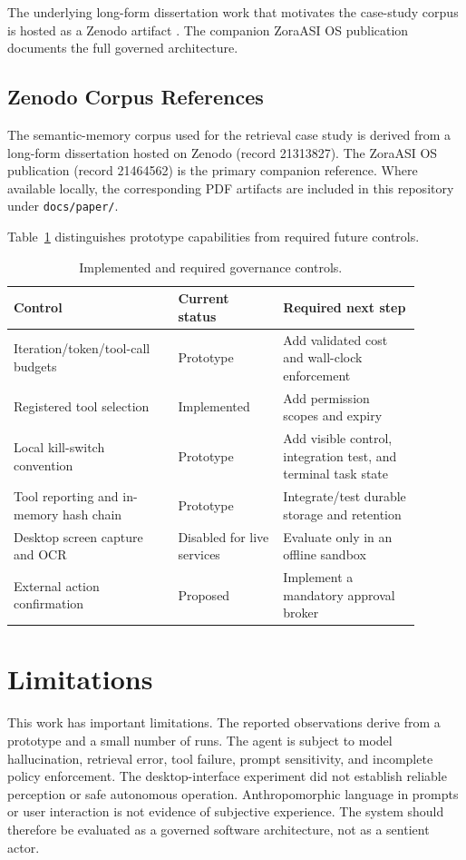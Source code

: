 \documentclass[11pt]{article}
\begin{document}
The underlying long-form dissertation work that motivates the case-study corpus is hosted as a Zenodo artifact \citep{baird2026dissertation_zenodo}. The companion ZoraASI OS publication \citep{baird2026zoraasi_zenodo} documents the full governed architecture.

\subsection{Zenodo Corpus References}
The semantic-memory corpus used for the retrieval case study is derived from a long-form dissertation hosted on Zenodo \citep{baird2026dissertation_zenodo} (record 21313827). The ZoraASI OS publication \citep{baird2026zoraasi_zenodo} (record 21464562) is the primary companion reference. Where available locally, the corresponding PDF artifacts are included in this repository under \texttt{docs/paper/}.

Table~\ref{tab:controls} distinguishes prototype capabilities from required future controls.

\begin{table}[ht]
\centering
\caption{Implemented and required governance controls.}
\label{tab:controls}
\begin{tabular}{p{0.36\linewidth}p{0.23\linewidth}p{0.30\linewidth}}
\toprule
Control & Current status & Required next step \\
\midrule
Iteration/token/tool-call budgets & Prototype & Add validated cost and wall-clock enforcement \\
Registered tool selection & Implemented & Add permission scopes and expiry \\
Local kill-switch convention & Prototype & Add visible control, integration test, and terminal task state \\
Tool reporting and in-memory hash chain & Prototype & Integrate/test durable storage and retention \\
Desktop screen capture and OCR & Disabled for live services & Evaluate only in an offline sandbox \\
External action confirmation & Proposed & Implement a mandatory approval broker \\
\bottomrule
\end{tabular}
\end{table}

\section{Limitations}
This work has important limitations. The reported observations derive from a prototype and a small number of runs. The agent is subject to model hallucination, retrieval error, tool failure, prompt sensitivity, and incomplete policy enforcement. The desktop-interface experiment did not establish reliable perception or safe autonomous operation. Anthropomorphic language in prompts or user interaction is not evidence of subjective experience. The system should therefore be evaluated as a governed software architecture, not as a sentient actor.
\end{document}
